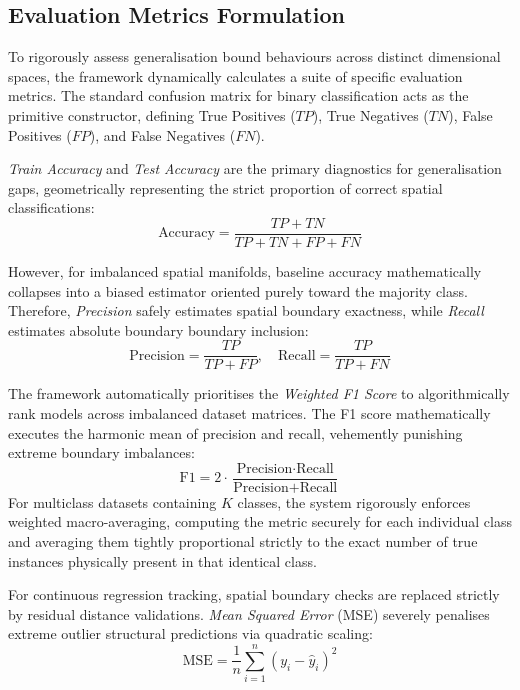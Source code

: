 \documentclass[conference]{IEEEtran}
\begin{document}
\subsection{Evaluation Metrics Formulation}

To rigorously assess generalisation bound behaviours across distinct dimensional spaces, the framework dynamically calculates a suite of specific evaluation metrics. The standard confusion matrix for binary classification acts as the primitive constructor, defining True Positives ($TP$), True Negatives ($TN$), False Positives ($FP$), and False Negatives ($FN$). 

\textit{Train Accuracy} and \textit{Test Accuracy} are the primary diagnostics for generalisation gaps, geometrically representing the strict proportion of correct spatial classifications:
\begin{equation}
\text{Accuracy} = \frac{TP + TN}{TP + TN + FP + FN}
\end{equation}

However, for imbalanced spatial manifolds, baseline accuracy mathematically collapses into a biased estimator oriented purely toward the majority class. Therefore, \textit{Precision} safely estimates spatial boundary exactness, while \textit{Recall} estimates absolute boundary boundary inclusion:
\begin{equation}
\text{Precision} = \frac{TP}{TP + FP}, \quad \text{Recall} = \frac{TP}{TP + FN}
\end{equation}

The framework automatically prioritises the \textit{Weighted F1 Score} to algorithmically rank models across imbalanced dataset matrices. The F1 score mathematically executes the harmonic mean of precision and recall, vehemently punishing extreme boundary imbalances:
\begin{equation}
\text{F1} = 2 \cdot \frac{\text{Precision} \cdot \text{Recall}}{\text{Precision} + \text{Recall}}
\end{equation}
For multiclass datasets containing $K$ classes, the system rigorously enforces weighted macro-averaging, computing the metric securely for each individual class and averaging them tightly proportional strictly to the exact number of true instances physically present in that identical class.

For continuous regression tracking, spatial boundary checks are replaced strictly by residual distance validations. \textit{Mean Squared Error} (MSE) severely penalises extreme outlier structural predictions via quadratic scaling:
\begin{equation}
\text{MSE} = \frac{1}{n} \sum_{i=1}^n (y_i - \hat{y}_i)^2
\end{equation}
\end{document}
